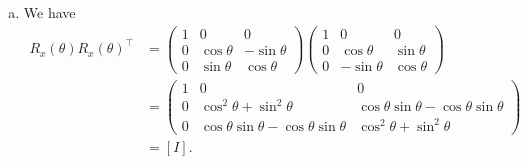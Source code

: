 \documentclass[12pt]{article} %
\begin{document}
\begin{solution}
\begin{enumerate}[(a)]
        \item We have
        \begin{align*}
R_x(\theta)R_x(\theta)^\top &= \begin{pmatrix} 1 & 0 & 0 \\ 0 & \cos\theta & -\sin \theta \\ 0 & \sin\theta & \cos \theta \end{pmatrix} \begin{pmatrix} 1 & 0 & 0 \\ 0 & \cos\theta & \sin \theta \\ 0 & -\sin\theta & \cos \theta \end{pmatrix} \\&= \begin{pmatrix} 1 & 0 & 0 \\ 0 & \cos^2 \theta + \sin^2 \theta & \cos\theta \sin \theta - \cos \theta \sin \theta\\ 0 & \cos\theta \sin \theta - \cos \theta \sin \theta & \cos^2 \theta + \sin^2 \theta \end{pmatrix}\\ &= [I].
        \end{align*}
    \end{enumerate}
\end{solution}
\end{document}
